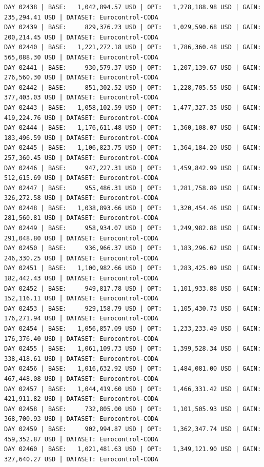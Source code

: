 \documentclass[11pt,a4paper]{article}
\begin{document}
\begin{verbatim}
DAY 02438 | BASE:   1,042,894.57 USD | OPT:   1,278,188.98 USD | GAIN: 235,294.41 USD | DATASET: Eurocontrol-CODA
DAY 02439 | BASE:     829,376.23 USD | OPT:   1,029,590.68 USD | GAIN: 200,214.45 USD | DATASET: Eurocontrol-CODA
DAY 02440 | BASE:   1,221,272.18 USD | OPT:   1,786,360.48 USD | GAIN: 565,088.30 USD | DATASET: Eurocontrol-CODA
DAY 02441 | BASE:     930,579.37 USD | OPT:   1,207,139.67 USD | GAIN: 276,560.30 USD | DATASET: Eurocontrol-CODA
DAY 02442 | BASE:     851,302.52 USD | OPT:   1,228,705.55 USD | GAIN: 377,403.03 USD | DATASET: Eurocontrol-CODA
DAY 02443 | BASE:   1,058,102.59 USD | OPT:   1,477,327.35 USD | GAIN: 419,224.76 USD | DATASET: Eurocontrol-CODA
DAY 02444 | BASE:   1,176,611.48 USD | OPT:   1,360,108.07 USD | GAIN: 183,496.59 USD | DATASET: Eurocontrol-CODA
DAY 02445 | BASE:   1,106,823.75 USD | OPT:   1,364,184.20 USD | GAIN: 257,360.45 USD | DATASET: Eurocontrol-CODA
DAY 02446 | BASE:     947,227.31 USD | OPT:   1,459,842.99 USD | GAIN: 512,615.69 USD | DATASET: Eurocontrol-CODA
DAY 02447 | BASE:     955,486.31 USD | OPT:   1,281,758.89 USD | GAIN: 326,272.58 USD | DATASET: Eurocontrol-CODA
DAY 02448 | BASE:   1,038,893.66 USD | OPT:   1,320,454.46 USD | GAIN: 281,560.81 USD | DATASET: Eurocontrol-CODA
DAY 02449 | BASE:     958,934.07 USD | OPT:   1,249,982.88 USD | GAIN: 291,048.80 USD | DATASET: Eurocontrol-CODA
DAY 02450 | BASE:     936,966.37 USD | OPT:   1,183,296.62 USD | GAIN: 246,330.25 USD | DATASET: Eurocontrol-CODA
DAY 02451 | BASE:   1,100,982.66 USD | OPT:   1,283,425.09 USD | GAIN: 182,442.43 USD | DATASET: Eurocontrol-CODA
DAY 02452 | BASE:     949,817.78 USD | OPT:   1,101,933.88 USD | GAIN: 152,116.11 USD | DATASET: Eurocontrol-CODA
DAY 02453 | BASE:     929,158.79 USD | OPT:   1,105,430.73 USD | GAIN: 176,271.94 USD | DATASET: Eurocontrol-CODA
DAY 02454 | BASE:   1,056,857.09 USD | OPT:   1,233,233.49 USD | GAIN: 176,376.40 USD | DATASET: Eurocontrol-CODA
DAY 02455 | BASE:   1,061,109.73 USD | OPT:   1,399,528.34 USD | GAIN: 338,418.61 USD | DATASET: Eurocontrol-CODA
DAY 02456 | BASE:   1,016,632.92 USD | OPT:   1,484,081.00 USD | GAIN: 467,448.08 USD | DATASET: Eurocontrol-CODA
DAY 02457 | BASE:   1,044,419.60 USD | OPT:   1,466,331.42 USD | GAIN: 421,911.82 USD | DATASET: Eurocontrol-CODA
DAY 02458 | BASE:     732,805.00 USD | OPT:   1,101,505.93 USD | GAIN: 368,700.93 USD | DATASET: Eurocontrol-CODA
DAY 02459 | BASE:     902,994.87 USD | OPT:   1,362,347.74 USD | GAIN: 459,352.87 USD | DATASET: Eurocontrol-CODA
DAY 02460 | BASE:   1,021,481.63 USD | OPT:   1,349,121.90 USD | GAIN: 327,640.27 USD | DATASET: Eurocontrol-CODA

\end{verbatim}
\end{document}
